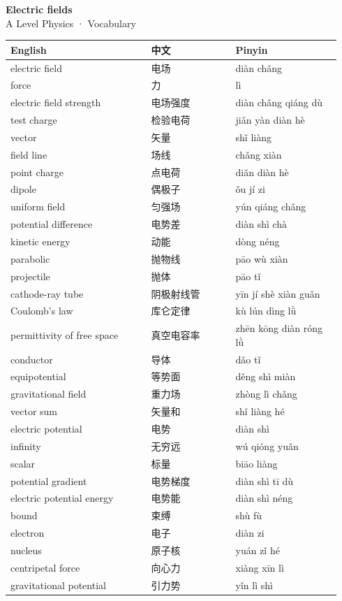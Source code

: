 \documentclass[11pt]{article}
\begin{document}
\begin{center}
  {\LARGE\bfseries Electric fields}\\[0.35em]
  {\large A Level Physics · Vocabulary}
\end{center}
\vspace{0.6em}

\begin{longtable}{@{}p{0.40\linewidth}p{0.24\linewidth}p{0.30\linewidth}@{}}
\toprule
\textbf{English} & \textbf{中文} & \textbf{Pinyin} \\
\midrule
\endhead
\bottomrule
\endlastfoot
electric field & 电场 & diàn chǎng \\
force & 力 & lì \\
electric field strength & 电场强度 & diàn chǎng qiáng dù \\
test charge & 检验电荷 & jiǎn yàn diàn hè \\
vector & 矢量 & shǐ liàng \\
field line & 场线 & chǎng xiàn \\
point charge & 点电荷 & diǎn diàn hè \\
dipole & 偶极子 & ǒu jí zi \\
uniform field & 匀强场 & yún qiáng chǎng \\
potential difference & 电势差 & diàn shì chà \\
kinetic energy & 动能 & dòng néng \\
parabolic & 抛物线 & pāo wù xiàn \\
projectile & 抛体 & pāo tǐ \\
cathode-ray tube & 阴极射线管 & yīn jí shè xiàn guǎn \\
Coulomb's law & 库仑定律 & kù lún dìng lǜ \\
permittivity of free space & 真空电容率 & zhēn kōng diàn róng lǜ \\
conductor & 导体 & dǎo tǐ \\
equipotential & 等势面 & děng shì miàn \\
gravitational field & 重力场 & zhòng lì chǎng \\
vector sum & 矢量和 & shǐ liàng hé \\
electric potential & 电势 & diàn shì \\
infinity & 无穷远 & wú qióng yuǎn \\
scalar & 标量 & biāo liàng \\
potential gradient & 电势梯度 & diàn shì tī dù \\
electric potential energy & 电势能 & diàn shì néng \\
bound & 束缚 & shù fù \\
electron & 电子 & diàn zi \\
nucleus & 原子核 & yuán zǐ hé \\
centripetal force & 向心力 & xiàng xīn lì \\
gravitational potential & 引力势 & yǐn lì shì \\
\end{longtable}
\end{document}
